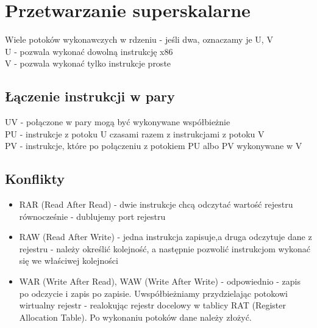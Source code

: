 \documentclass[a4paper]{article}
\begin{document}
\section{Przetwarzanie superskalarne}
Wiele potoków wykonawczych w rdzeniu - jeśli dwa, oznaczamy je U, V\\
U - pozwala wykonać dowolną instrukcję x86\\
V - pozwala wykonać tylko instrukcje proste\\
\subsection{Łączenie instrukcji w pary}
UV - połączone w pary mogą być wykonywane współbieżnie\\
PU - instrukcje z potoku U czasami razem z instrukcjami z potoku V\\
PV - instrukcje, które po połączeniu z potokiem PU albo PV wykonywane w V\\
\subsection{Konflikty}
\begin{itemize}
\item RAR (Read After Read) - dwie instrukcje chcą odczytać wartość rejestru równocześnie - dublujemy port rejestru
\item RAW (Read After Write) - jedna instrukcja zapisuje,a druga odczytuje dane z rejestru - należy określić kolejność, a następnie pozwolić instrukcjom wykonać się we właściwej kolejności
\item WAR (Write After Read), WAW (Write After Write) - odpowiednio - zapis po odczycie i zapis po zapisie. Uwspółbieżniamy przydzielając potokowi wirtualny rejestr - realokując rejestr docelowy w tablicy RAT (Register Allocation Table). Po wykonaniu potoków dane należy złożyć.
\end{itemize}
\end{document}
